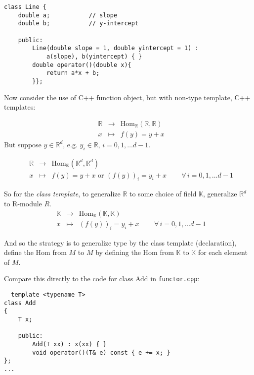 \documentclass[10pt]{amsart}
\begin{document}
\begin{multicols*}{2}
\begin{lstlisting}
class Line {
	double a;			// slope
	double b; 			// y-intercept
	
	public:
		Line(double slope = 1, double yintercept = 1) : 
			a(slope), b(yintercept) { } 
		double operator()(double x){
			return a*x + b;
		}};
  \end{lstlisting}
Now consider the use of C++ function object, but with non-type template, C++ templates:

\begin{equation}
\begin{aligned}
  & \mathbb{R} & \to & \text{Hom}_{\mathbb{R}}( \mathbb{R}, \mathbb{R} ) \\ 
  & x & \mapsto & f(y) = y + x 
  \end{aligned}
  \end{equation}
But suppose $y\in \mathbb{R}^d$, e.g. $y_i \in \mathbb{R}$, $i=0,1,\dots d-1$.

\begin{equation}
\begin{aligned}
  & \mathbb{R} & \to & \text{Hom}_{\mathbb{R}}( \mathbb{R}^d, \mathbb{R}^d ) \\ 
  & x & \mapsto & f(y) = y + x  \text{ or } (f(y))_i = y_i + x \qquad \, \forall \, i = 0, 1, \dots d-1
  \end{aligned}
  \end{equation}

So for the \emph{class template}, to generalize $\mathbb{R}$ to some choice of field $\mathbb{K}$, generalize $\mathbb{R}^d$ to R-module $R$.
\begin{equation}
\begin{aligned}
  & \mathbb{K} & \to & \text{Hom}_{\mathbb{K}}( \mathbb{K}, \mathbb{K} ) \\ 
  & x & \mapsto & (f(y))_i = y_i + x \qquad \, \forall \, i = 0, 1, \dots d-1
  \end{aligned}
  \end{equation}

And so the strategy is to generalize type by the class template (declaration), define the $\text{Hom}$ from $M$ to $M$ by defining the $\text{Hom}$ from $\mathbb{K}$ to $\mathbb{K}$ for each element of $M$.  

Compare this directly to the code for class Add in \verb|functor.cpp|:
\begin{lstlisting}
  template <typename T>
class Add
{
	T x;
	
	public:
		Add(T xx) : x(xx) { } 
		void operator()(T& e) const { e += x; }
};
...



\end{lstlisting}
\end{multicols*}
\end{document}
